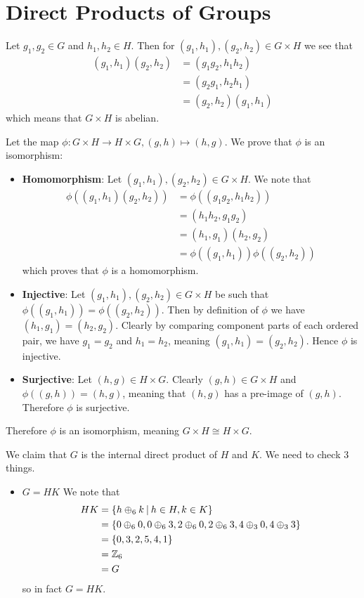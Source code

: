 \section{Direct Products of Groups}
\begin{questions}
    \item Let $g_1, g_2 \in G$ and $h_1, h_2 \in H$. Then for $(g_1, h_1), (g_2, h_2) \in G\times H$ we see that
    \begin{align*}
        (g_1, h_1)(g_2, h_2) &= (g_1g_2, h_1h_2)\\
        &= (g_2g_1, h_2h_1)\\
        &= (g_2,h_2)(g_1,h_1)
    \end{align*}
    which means that $G \times H$ is abelian.

    \item Let the map $\phi: G\times H \to H \times G, (g, h) \mapsto (h, g)$. We prove that $\phi$ is an isomorphism:
    \begin{itemize}
        \item \textbf{Homomorphism}: Let $(g_1, h_1), (g_2, h_2) \in G \times H$. We note that
        \begin{align*}
            \phi((g_1, h_1)(g_2, h_2)) &= \phi((g_1g_2, h_1h_2))\\
            &= (h_1h_2, g_1g_2)\\
            &= (h_1, g_1)(h_2, g_2)\\
            &= \phi((g_1, h_1))\phi((g_2, h_2))
        \end{align*}
        which proves that $\phi$ is a homomorphism.
        \item \textbf{Injective}: Let $(g_1, h_1), (g_2, h_2) \in G \times H$ be such that $\phi((g_1, h_1)) = \phi((g_2, h_2))$. Then by definition of $\phi$ we have $(h_1, g_1) = (h_2, g_2)$. Clearly by comparing component parts of each ordered pair, we have $g_1 = g_2$ and $h_1 = h_2$, meaning $(g_1, h_1) = (g_2, h_2)$. Hence $\phi$ is injective.
        \item \textbf{Surjective}: Let $(h, g) \in H \times G$. Clearly $(g, h) \in G \times H$ and $\phi((g, h)) = (h, g)$, meaning that $(h, g)$ has a pre-image of $(g, h)$. Therefore $\phi$ is surjective.
    \end{itemize}
    Therefore $\phi$ is an isomorphism, meaning $G \times H \cong H \times G$.

    \item We claim that $G$ is the internal direct product of $H$ and $K$. We need to check 3 things.
    \begin{itemize}
        \item $\boxed{G = HK}$ We note that
        \begin{align*}
            HK &= \{h \oplus_6 k \vert h \in H, k \in K\}\\
            &= \{0 \oplus_6 0, 0 \oplus_6 3, 2 \oplus_6 0, 2 \oplus_6 3, 4 \oplus_3 0, 4 \oplus_3 3\}\\
            &= \{0, 3, 2, 5, 4, 1\}\\
            &= \Z_6\\
            &= G
        \end{align*}
        so in fact $G = HK$.


\end{itemize}
\end{questions}
